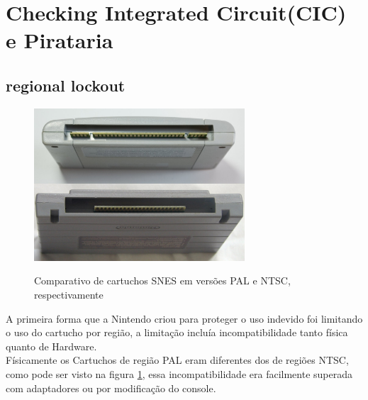 \documentclass[paper=a4, fontsize=11pt]{scrartcl}	%
\numberwithin{equation}{section}															%
\numberwithin{figure}{section}																%
\numberwithin{table}{section}																%
\begin{document}
\section{Checking Integrated Circuit(CIC) e Pirataria}
\subsection*{regional lockout}
\begin{figure}[h!]
	\centering
    \includegraphics[width=0.7\textwidth]{img/snescartcomp}
    \label{fig:comparative}
    \caption{Comparativo de cartuchos SNES em versões PAL e NTSC, respectivamente}
\end{figure}
A primeira forma que a Nintendo criou para proteger o uso indevido foi limitando o uso do cartucho por região, a limitação incluía incompatibilidade tanto física quanto de Hardware.\\
Físicamente os Cartuchos de região PAL eram diferentes dos de regiões NTSC, como pode ser visto na figura \ref{fig:comparative}, essa incompatibilidade era facilmente superada com adaptadores ou por modificação do console.\\
\end{document}
